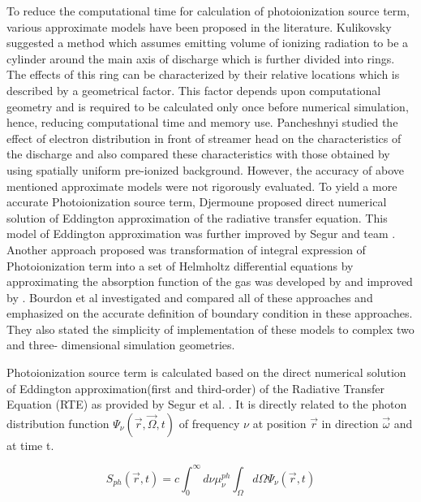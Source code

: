 \documentclass[paper=a4, fontsize=13pt]{scrartcl}
\begin{document}
To reduce the computational time for calculation of photoionization source term, various approximate models have been proposed in the literature. Kulikovsky \cite{Kulikovsky2000RoleDynamics} suggested a method which assumes emitting volume of ionizing radiation to be a cylinder around the main axis of discharge which is further divided into rings. The effects of this ring can be characterized by their relative locations which is described by a geometrical factor. This factor depends upon computational geometry and is required to be calculated only once before numerical simulation, hence, reducing computational time and memory use. Pancheshnyi \cite{Pancheshnyi2001RoleStreamer} studied the effect of electron distribution in front of streamer head on the characteristics of the discharge and also compared these characteristics with those obtained by using spatially uniform pre-ionized background. However, the accuracy of above mentioned approximate models were not rigorously evaluated. To yield a more accurate Photoionization source term, Djermoune \cite{Djermoune1995TwoDischarge} proposed direct numerical solution of Eddington approximation of the radiative transfer equation. This model of Eddington approximation was further improved by Segur and team \cite{Segur2006TheDischarges}. Another approach proposed was transformation of integral expression of Photoionization term into a set of Helmholtz differential equations by approximating the absorption function of the gas was developed by \cite{ZhelezniakM.B.andMnatsakanianA.K.andSizykh1982PhotoionizationDischarge} and improved by \cite{Luque2007PhotoionizationModes}. Bourdon et al \cite{Bourdon2007EfficientEquations} investigated and compared all of these approaches and emphasized on the accurate definition of boundary condition in these approaches. They also stated the simplicity of implementation of these models to complex two and three- dimensional simulation geometries.

Photoionization source term is calculated based on the direct numerical solution of Eddington approximation(first and third-order) of the Radiative Transfer Equation (RTE) as provided by Segur et al. \cite{Segur2006}. It is directly related to the photon distribution function $\Psi_\nu(\vec{r},\vec{\Omega},t)$ of frequency $\nu$ at position $\vec{r}$ in direction $\vec{\omega}$ and at time t.

\begin{equation}\label{eq:Photoionization Source term 1}
S_{ph} (\vec{r},t) = c\int_{0}^{\infty}d\nu \mu_{\nu}^{ph}  \int_{\Omega}d\Omega\Psi_\nu(\vec{r},t)
\end{equation}
\end{document}
